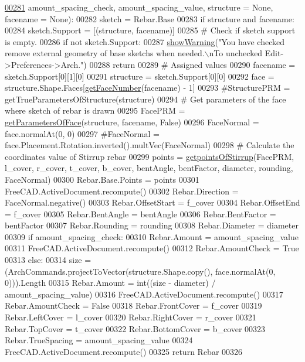 \begin{DoxyCode}
\hypertarget{namespaceStirrup.tex_l00281}{}\hyperlink{namespaceStirrup_a1f6d278ace7fe116895dba342e2a3573}{00281}         amount\_spacing\_check, amount\_spacing\_value, structure = \textcolor{keywordtype}{None}, facename = \textcolor{keywordtype}{None}):
00282     sketch = Rebar.Base
00283     \textcolor{keywordflow}{if} structure \textcolor{keywordflow}{and} facename:
00284         sketch.Support = [(structure, facename)]
00285     \textcolor{comment}{# Check if sketch support is empty.}
00286     \textcolor{keywordflow}{if} \textcolor{keywordflow}{not} sketch.Support:
00287         \hyperlink{namespaceRebarfunc_a2278a0602d46a62953af1fcf2e574a94}{showWarning}(\textcolor{stringliteral}{"You have checked remove external geometry of base sketchs when needed.\(\backslash\)nTo
       unchecked Edit->Preferences->Arch."})
00288         \textcolor{keywordflow}{return}
00289     \textcolor{comment}{# Assigned values}
00290     facename = sketch.Support[0][1][0]
00291     structure = sketch.Support[0][0]
00292     face = structure.Shape.Faces[\hyperlink{namespaceRebarfunc_a3885b3b63e3a41508ac79bc7550cf301}{getFaceNumber}(facename) - 1]
00293     \textcolor{comment}{#StructurePRM = getTrueParametersOfStructure(structure)}
00294     \textcolor{comment}{# Get parameters of the face where sketch of rebar is drawn}
00295     FacePRM = \hyperlink{namespaceRebarfunc_a92122b3d7cedd3d47bb63380a5ac4d08}{getParametersOfFace}(structure, facename, \textcolor{keyword}{False})
00296     FaceNormal = face.normalAt(0, 0)
00297     \textcolor{comment}{#FaceNormal = face.Placement.Rotation.inverted().multVec(FaceNormal)}
00298     \textcolor{comment}{# Calculate the coordinates value of Stirrup rebar}
00299     points = \hyperlink{namespaceStirrup_aa6df5118806bfe9d3a799e1bf549bb0a}{getpointsOfStirrup}(FacePRM, l\_cover, r\_cover, t\_cover, b\_cover, bentAngle, 
      bentFactor, diameter, rounding, FaceNormal)
00300     Rebar.Base.Points = points
00301     FreeCAD.ActiveDocument.recompute()
00302     Rebar.Direction = FaceNormal.negative()
00303     Rebar.OffsetStart = f\_cover
00304     Rebar.OffsetEnd = f\_cover
00305     Rebar.BentAngle = bentAngle
00306     Rebar.BentFactor = bentFactor
00307     Rebar.Rounding = rounding
00308     Rebar.Diameter = diameter
00309     \textcolor{keywordflow}{if} amount\_spacing\_check:
00310         Rebar.Amount = amount\_spacing\_value
00311         FreeCAD.ActiveDocument.recompute()
00312         Rebar.AmountCheck = \textcolor{keyword}{True}
00313     \textcolor{keywordflow}{else}:
00314         size = (ArchCommands.projectToVector(structure.Shape.copy(), face.normalAt(0, 0))).Length
00315         Rebar.Amount = int((size - diameter) / amount\_spacing\_value)
00316         FreeCAD.ActiveDocument.recompute()
00317         Rebar.AmountCheck = \textcolor{keyword}{False}
00318     Rebar.FrontCover = f\_cover
00319     Rebar.LeftCover = l\_cover
00320     Rebar.RightCover = r\_cover
00321     Rebar.TopCover = t\_cover
00322     Rebar.BottomCover = b\_cover
00323     Rebar.TrueSpacing = amount\_spacing\_value
00324     FreeCAD.ActiveDocument.recompute()
00325     \textcolor{keywordflow}{return} Rebar
00326 
\end{DoxyCode}


